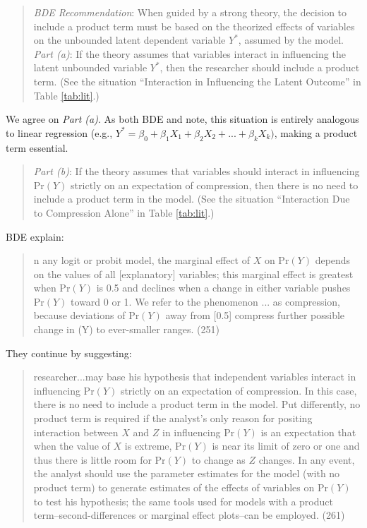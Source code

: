 \documentclass[12pt]{article}
\begin{document}
\begin{quote}\singlespace
\textit{BDE Recommendation}: When guided by a strong theory, the decision to include a product term must be based on the theorized effects of variables on the unbounded latent dependent variable $Y^*$, assumed by the model.\vspace{2mm}\\
\indent \textit{Part (a)}: If the theory assumes that variables interact in influencing the latent unbounded variable $Y^*$, then the researcher should include a product term. (See the situation ``Interaction in Influencing the Latent Outcome'' in Table \ref{tab:lit}.)
\end{quote}
\doublespace
We agree on \textit{Part (a)}. As both BDE and \cite{Nagler1991} note, this situation is entirely analogous to linear regression (e.g.,  $Y^* = \beta_0 + \beta_1X_1 + \beta_2X_2 + ... + \beta_kX_k )$, making a product term essential.
\begin{quote}\singlespace
\indent \textit{Part (b)}: If the theory assumes that variables should interact in influencing $\text{Pr}(Y)$ strictly on an expectation of compression, then there is no need to include a product term in the model. (See the situation ``Interaction Due to Compression Alone'' in Table \ref{tab:lit}.)
\end{quote}\doublespace
BDE explain:
\begin{quote}\singlespace 
[I]n any logit or probit model, the marginal effect
of $X$ on $\text{Pr}(Y)$ depends on the values of all [explanatory]
variables; this marginal effect is greatest when $\text{Pr}(Y)$ is
0.5 and declines when a change in either variable pushes
$\text{Pr}(Y)$ toward 0 or 1. We refer to the phenomenon ... as compression,
because deviations of $\text{Pr}(Y)$ away from [0.5] compress
further possible change in (Y) to ever-smaller ranges.
 (251)
 \end{quote}\doublespace
They continue by suggesting:
\begin{quote}\singlespace
[A] researcher...may base his hypothesis that independent variables interact in influencing $\text{Pr}(Y)$ strictly on an expectation of compression. In this case, there is no need to include a product term in the model. Put differently, no product term is required if the analyst's only reason for positing interaction between $X$ and $Z$ in influencing $\text{Pr}(Y)$ is an expectation that when the value of $X$ is extreme, $\text{Pr}(Y)$ is near its limit of zero or one and thus there is little room for $\text{Pr}(Y)$ to change as $Z$ changes. In any event, the analyst should use the parameter estimates for the model (with no product term) to generate estimates of the effects of variables on $\text{Pr}(Y)$ to test his hypothesis; the same tools used for models with a product term--second-differences or marginal effect plots--can be employed.
(261)
\end{quote}
\end{document}
